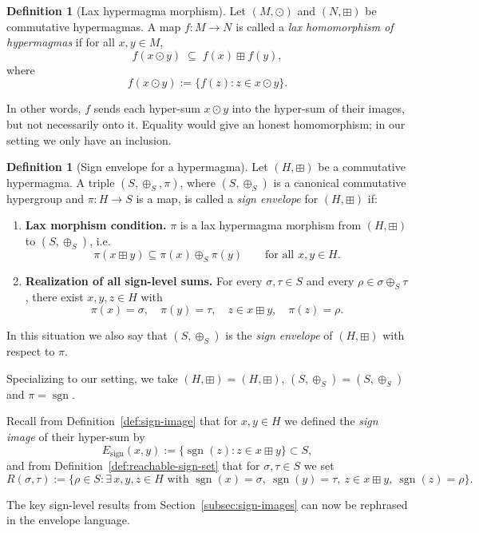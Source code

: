 \documentclass[11pt]{amsart}
\numberwithin{equation}{section}
\theoremstyle{definition}
\newtheorem{definition}[theorem]{Definition}
\theoremstyle{remark}
\newcommand{\Hnum}{H}                      %
\newcommand{\Sset}{S}                      %
\newcommand{\sgn}{\operatorname{sgn}}
\newcommand{\op}{\boxplus}                 %
\newcommand{\sop}{\oplus_S}                %
\begin{document}
\begin{definition}[Lax hypermagma morphism]
\label{def:lax-morphism}
Let $(M,\odot)$ and $(N,\boxplus)$ be commutative hypermagmas.  A map
$f:M\to N$ is called a \emph{lax homomorphism of hypermagmas} if for
all $x,y\in M$,
\[
  f(x\odot y)
  \;\subseteq\;
  f(x)\boxplus f(y),
\]
where
\[
  f(x\odot y) := \{f(z):z\in x\odot y\}.
\]
\end{definition}

In other words, $f$ sends each hyper-sum $x\odot y$ into the
hyper-sum of their images, but not necessarily onto it.  Equality
would give an honest homomorphism; in our setting we only have an
inclusion.

\begin{definition}[Sign envelope for a hypermagma]
\label{def:sign-envelope-general}
Let $(H,\boxplus)$ be a commutative hypermagma.  A triple
$(S,\oplus_S,\pi)$, where $(S,\oplus_S)$ is a canonical commutative
hypergroup and $\pi:H\to S$ is a map, is called a
\emph{sign envelope} for $(H,\boxplus)$ if:
\begin{enumerate}
  \item \textbf{Lax morphism condition.}
  $\pi$ is a lax hypermagma morphism from $(H,\boxplus)$ to
  $(S,\oplus_S)$, i.e.
  \[
    \pi(x\boxplus y)
    \subseteq
    \pi(x)\oplus_S\pi(y)
    \qquad\text{for all }x,y\in H.
  \]
  \item \textbf{Realization of all sign-level sums.}
  For every $\sigma,\tau\in S$ and every $\rho\in\sigma\oplus_S\tau$,
  there exist $x,y,z\in H$ with
  \[
    \pi(x)=\sigma,\quad\pi(y)=\tau,\quad z\in x\boxplus y,
    \quad\pi(z)=\rho.
  \]
\end{enumerate}
In this situation we also say that $(S,\oplus_S)$ is the
\emph{sign envelope} of $(H,\boxplus)$ with respect to $\pi$.
\end{definition}

Specializing to our setting, we take $(H,\boxplus)=(\Hnum,\op)$,
$(S,\oplus_S)=(\Sset,\sop)$ and $\pi=\sgn$.

Recall from Definition~\ref{def:sign-image} that for $x,y\in\Hnum$ we
defined the \emph{sign image} of their hyper-sum by
\[
  E_{\mathrm{sign}}(x,y)
  := \{\sgn(z):z\in x\op y\}\subset\Sset,
\]
and from Definition~\ref{def:reachable-sign-set} that for
$\sigma,\tau\in\Sset$ we set
\[
  R(\sigma,\tau)
  := \{\rho\in\Sset : \exists\,x,y,z\in\Hnum
      \text{ with } \sgn(x)=\sigma,\ \sgn(y)=\tau,\ 
      z\in x\op y,\ \sgn(z)=\rho\}.
\]

The key sign-level results from Section~\ref{subsec:sign-images} can
now be rephrased in the envelope language.
\end{document}
